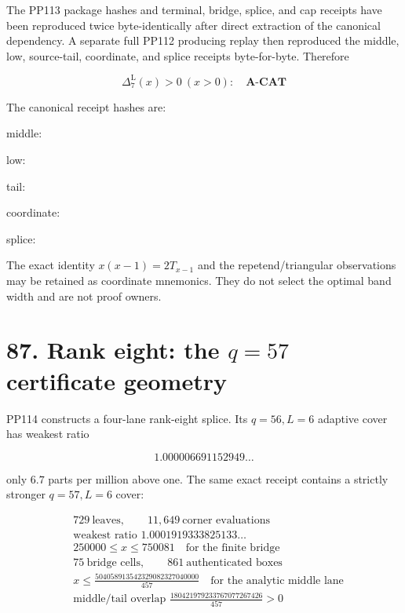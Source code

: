 \documentclass[
  11pt,
]{book}
\begin{document}
The PP113 package hashes and terminal, bridge, splice, and cap receipts
have been reproduced twice byte-identically after direct extraction of
the canonical dependency. A separate full PP112 producing replay then
reproduced the middle, low, source-tail, coordinate, and splice receipts
byte-for-byte. Therefore

\[
\boxed{\Delta_7^{\mathrm L}(x)>0\ (x>0):\quad\textbf{A-CAT}}
\tag{86.1}
\]

The canonical receipt hashes are:

\noindent middle:

\noindent low:

\noindent tail:

\noindent coordinate:

\noindent splice:

The exact identity \(x(x-1)=2T_{x-1}\) and the repetend/triangular
observations may be retained as coordinate mnemonics. They do not select
the optimal band width and are not proof owners.

\section{\texorpdfstring{87. Rank eight: the \(q=57\) certificate
geometry}{87. Rank eight: the q=57 certificate geometry}}\label{rank-eight-the-q57-certificate-geometry}

PP114 constructs a four-lane rank-eight splice. Its \(q=56,L=6\)
adaptive cover has weakest ratio

\[
1.000006691152949\ldots
\tag{87.1}
\]

only \(6.7\) parts per million above one. The same exact receipt
contains a strictly stronger \(q=57,L=6\) cover:

\[
\begin{aligned}
&729\ \text{leaves},\qquad 11{,}649\ \text{corner evaluations}\\
&\text{weakest ratio }1.0001919333825133\ldots\\
&250000\le x\le750081\quad\text{for the finite bridge}\\
&75\ \text{bridge cells},\qquad861\ \text{authenticated boxes}\\
&x\le\frac{504058913542329082327040000}{457}
\quad\text{for the analytic middle lane}\\
&\text{middle/tail overlap }
\frac{180421979233767077267426}{457}>0
\end{aligned}
\tag{87.2}
\]
\end{document}

